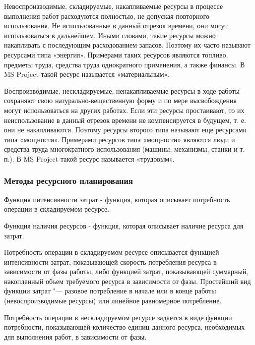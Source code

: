 \documentclass{../industrial-development}
\begin{document}
Невоспроизводимые, складируемые, накапливаемые ресурсы в процессе выполнения работ расходуются полностью, не допуская повторного использования.
Не использованные в данный отрезок времени, они могут использоваться в дальнейшем. Иными словами, такие ресурсы можно накапливать с последующим расходованием запасов. Поэтому их часто называют ресурсами типа «энергия». Примерами таких ресурсов являются топливо, предметы труда, средства труда однократного применения, а также финансы. В MS Project такой ресурс называется «материальным».

Воспроизводимые, нескладируемые, ненакапливаемые ресурсы в ходе работы сохраняют свою натурально-вещественную форму и по мере высвобождения могут использоваться на других работах. Если эти ресурсы простаивают, то их неиспользование в данный отрезок времени не компенсируется в будущем, т. е. они не накапливаются. Поэтому ресурсы второго типа называют еще ресурсами типа «мощности». Примерами ресурсов типа «мощности» являются люди и средства труда многократного использования (машины, механизмы, станки и т. п.). В MS Project такой ресурс называется «трудовым».

    \begin{frame} \frametitle{Методы ресурсного планирования}
        \begin{definition}
          Функция интенсивности затрат - функция, которая описывает потребность операции в складируемом ресурсе.
        \end{definition}

\vspace{0.5cm}

        \begin{definition}
          Функция наличия ресурсов - функция, которая описывает наличие ресурса для затрат.
        \end{definition}
    \end{frame}
    \lecturenotes 

Потребность операции в складируемом ресурсе описывается функцией интенсивности затрат, показывающей скорость потребления ресурса в зависимости от фазы работы, либо функцией затрат, показывающей суммарный, накопленный объем требуемого ресурса в зависимости от фазы. Простейший вид функции затрат "--- разовое потребление в начале или в конце работы (невоспроизводимые ресурсы) или линейное равномерное потребление. 

Потребность операции в нескладируемом ресурсе задается в виде функции потребности, показывающей количество единиц данного ресурса, необходимых для выполнения работ, в зависимости от фазы.
\end{document}
